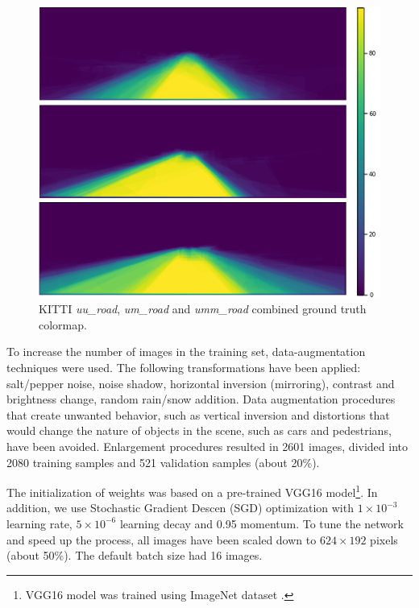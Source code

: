 \begin{figure}%
  \centering
  \includegraphics[width=1\columnwidth]{../imagens/visualiz_dados/kitti_colormap.png} %
  \caption{KITTI \textit{uu\_road}, \textit{um\_road} and \textit{umm\_road} combined ground truth colormap.}
  \label{fig:kitti_colormap}
\end{figure}

To increase the number of images in the training set, data-augmentation techniques were used.
The following transformations have been applied: salt/pepper noise, noise shadow, horizontal inversion (mirroring), contrast and brightness change, random rain/snow addition.
Data augmentation procedures that create unwanted behavior, such as vertical inversion and distortions that would change the nature of objects in the scene, such as cars and pedestrians, have been avoided.
Enlargement procedures resulted in 2601 images, divided into 2080 training samples and 521 validation samples (about 20\%).

The initialization of weights was based on a pre-trained VGG16 model\footnote{VGG16 model was trained using ImageNet dataset \cite{ILSVRC15}.}.
In addition, we use Stochastic Gradient Descen (SGD) optimization with $1 \times 10^{-3}$ learning rate, $5 \times 10^{-6}$ learning decay and 0.95 momentum.
To tune the network and speed up the process, all images have been scaled down to $624 \times 192$ pixels (about 50\%). 
The default batch size had 16 images.

